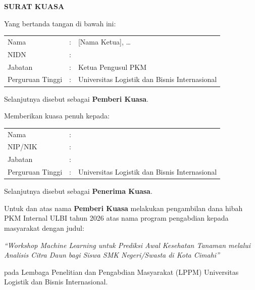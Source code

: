 
\begin{center}
    \textbf{SURAT KUASA}
\end{center}

\vspace{0.5cm}

Yang bertanda tangan di bawah ini:

\begin{tabular}{lll}
    Nama            & : & {[Nama Ketua]}, \ldots \\
    NIDN            & : & \\
    Jabatan         & : & Ketua Pengusul PKM \\
    Perguruan Tinggi & : & Universitas Logistik dan Bisnis Internasional \\
\end{tabular}

\vspace{0.3cm}

Selanjutnya disebut sebagai \textbf{Pemberi Kuasa}.

\vspace{0.5cm}

Memberikan kuasa penuh kepada:

\begin{tabular}{lll}
    Nama            & : & \\
    NIP/NIK         & : & \\
    Jabatan         & : & \\
    Perguruan Tinggi & : & Universitas Logistik dan Bisnis Internasional \\
\end{tabular}

\vspace{0.3cm}

Selanjutnya disebut sebagai \textbf{Penerima Kuasa}.

\vspace{0.5cm}

Untuk dan atas nama \textbf{Pemberi Kuasa} melakukan pengambilan dana hibah PKM Internal ULBI tahun 2026 atas nama program pengabdian kepada masyarakat dengan judul:

\begin{center}
    \textit{``Workshop Machine Learning untuk Prediksi Awal Kesehatan Tanaman melalui Analisis Citra Daun bagi Siswa SMK Negeri/Swasta di Kota Cimahi''}
\end{center}

pada Lembaga Penelitian dan Pengabdian Masyarakat (LPPM) Universitas Logistik dan Bisnis Internasional.

